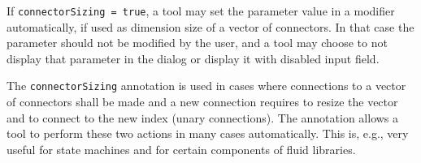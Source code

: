If \lstinline!connectorSizing = true!, a tool may set the parameter value in a modifier automatically, if used as dimension size of a vector of connectors.
In that case the parameter should not be modified by the user, and a tool may choose to not display that parameter in the dialog or display it with disabled input field.

\begin{nonnormative}
The \lstinline!connectorSizing! annotation is used in cases
where connections to a vector of connectors shall be made and a new
connection requires to resize the vector and to connect to the new index
(unary connections). The annotation allows a tool to perform these two
actions in many cases automatically. This is, e.g., very useful for
state machines and for certain components of fluid libraries.
\end{nonnormative}


